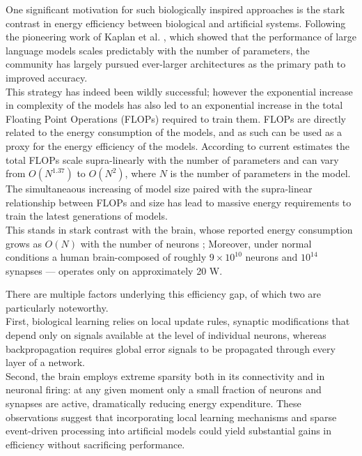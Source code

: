 \documentclass[a4paper,12pt]{report}
\begin{document}
One significant motivation for such biologically inspired approaches is the stark contrast in energy 
efficiency between biological and artificial systems. 
Following the pioneering work of Kaplan et al. \cite{kaplan2020scalinglawsneurallanguage}, which 
showed that the performance of large language models scales predictably with the number of parameters, 
the community has largely pursued ever-larger architectures as the primary path to improved 
accuracy. \\
This strategy has indeed been wildly successful; however the exponential increase in complexity of the 
models has also led to an exponential increase in the total Floating Point Operations (FLOPs) 
required to train them. FLOPs are directly related to the energy consumption of the models, 
and as such can be used as a proxy for the energy efficiency of the models. According to current 
estimates \cite{kaplan2020scalinglawsneurallanguage, hoffmann2022trainingcomputeoptimallargelanguage}
 the total FLOPs scale supra-linearly with the 
number of parameters and can vary from $O(N^{1.37})$ to $O(N^2)$, where $N$ is the number of 
parameters in the model. The simultaneaous increasing of model size paired with the supra-linear 
relationship between FLOPs and size has lead to massive energy requirements to train the latest 
generations of models. \\
This stands in stark contrast with the brain, whose reported energy consumption grows as 
$O(N)$ with the number of neurons \cite{10.1371/journal.pone.0017514}; Moreover, under normal 
conditions a human brain-composed of roughly $9\times10^{10}$ neurons and $10^{14}$ synapses --- 
operates only on approximately 20 W. \cite{doi:10.1097/00004647-200110000-00001}
\vspace{0.5em}

There are multiple factors underlying this efficiency gap, of which two are particularly noteworthy. \\
First, biological learning relies on local update rules, synaptic modifications that depend only 
on signals available at the level of individual neurons, whereas backpropagation requires global 
error signals to be propagated through every layer of a network.
\cite{Xu2024} \\
Second, the brain employs extreme sparsity both in its connectivity and in neuronal firing: at any 
given moment only a small fraction of neurons and synapses are active, dramatically reducing energy 
expenditure. These observations suggest that incorporating local learning mechanisms and sparse 
event-driven processing into artificial models could yield substantial gains in efficiency without 
sacrificing performance.
\vspace{0.5em}
\end{document}
